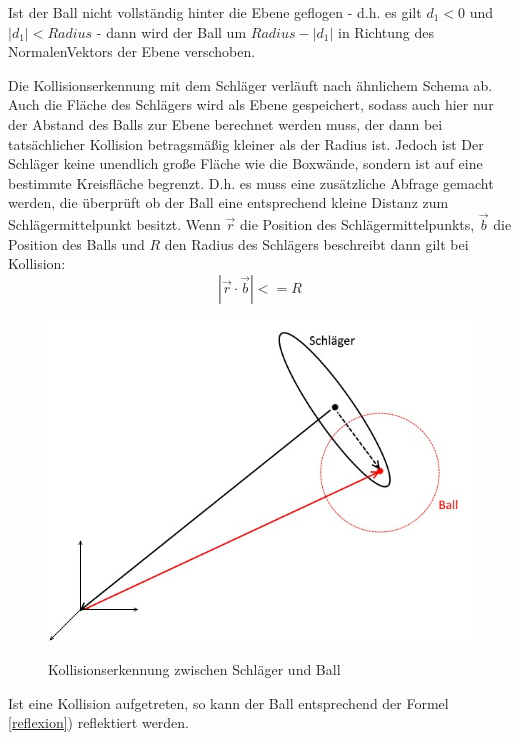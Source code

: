 Ist der Ball nicht vollständig hinter die Ebene geflogen - d.h. es gilt $d_1<0$ und $|d_1|<Radius $ - dann wird der Ball um $Radius - |d_1|$ in Richtung des NormalenVektors der Ebene verschoben.

Die Kollisionserkennung mit dem Schläger verläuft nach ähnlichem Schema ab. Auch die Fläche des Schlägers wird als Ebene gespeichert, sodass auch hier nur der Abstand des Balls zur Ebene berechnet werden muss, der dann bei tatsächlicher Kollision betragsmäßig kleiner als der Radius ist. Jedoch ist Der Schläger keine unendlich große Fläche wie die  Boxwände, sondern ist auf eine bestimmte Kreisfläche begrenzt. D.h. es muss eine zusätzliche Abfrage gemacht werden, die überprüft ob der Ball eine entsprechend kleine Distanz zum Schlägermittelpunkt besitzt.
Wenn $\vec{r}$ die Position des Schlägermittelpunkts, $\vec{b}$ die Position des Balls und $R$ den Radius des Schlägers beschreibt dann gilt bei Kollision:
\begin{equation}
	|\vec{r}\cdot\vec{b}| <= R
\end{equation}

\begin{figure}[h]
   \begin{center}
    \includegraphics[scale=0.4]{bilder/collisionRacket}\label{fig_colRacket}
   \end{center} 
    \caption[Testbilder]{Kollisionserkennung zwischen Schläger und Ball}
        \label{fig_colRacket2}
\end{figure} 

Ist eine Kollision aufgetreten, so kann der Ball entsprechend der Formel \ref{reflexion}) reflektiert werden.

